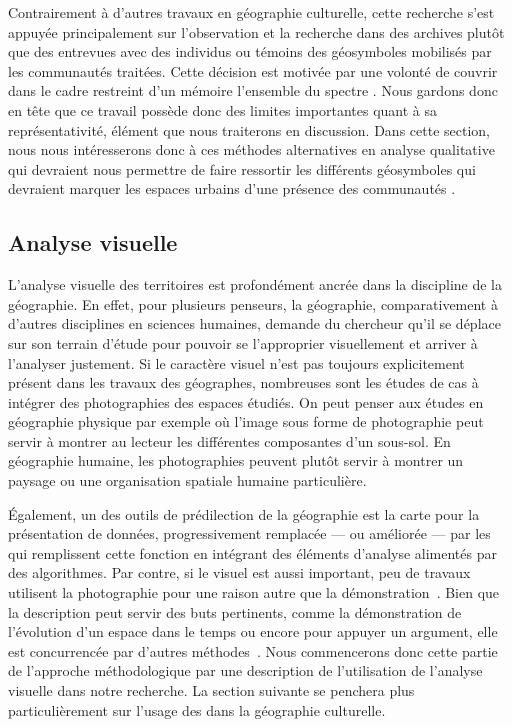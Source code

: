 Contrairement à d'autres travaux en géographie culturelle, cette recherche s'est appuyée principalement sur l'observation et la recherche dans des archives plutôt que des entrevues avec des individus \lgbt{} ou témoins des géosymboles mobilisés par les communautés traitées.
Cette décision est motivée par une volonté de couvrir dans le cadre restreint d'un mémoire l'ensemble du spectre \lgbt{}.
Nous gardons donc en tête que ce travail possède donc des limites importantes quant à sa représentativité, élément que nous traiterons en discussion.
Dans cette section, nous nous intéresserons donc à ces méthodes alternatives en analyse qualitative qui devraient nous permettre de faire ressortir les différents géosymboles qui devraient marquer les espaces urbains d'une présence des communautés \lgbt{}.

\subsection{Analyse visuelle}
\label{sub:analyse_visuelle}

L'analyse visuelle des territoires est profondément ancrée dans la discipline de la géographie.
En effet, pour plusieurs penseurs\missref{}, la géographie, comparativement à d'autres disciplines en sciences humaines, demande du chercheur qu'il se déplace sur son terrain d'étude pour pouvoir se l'approprier visuellement et arriver à l'analyser justement.
Si le caractère visuel n'est pas toujours explicitement présent dans les travaux des géographes, nombreuses sont les études de cas à intégrer des photographies des espaces étudiés.
On peut penser aux études en géographie physique par exemple où l'image sous forme de photographie peut servir à montrer au lecteur les différentes composantes d'un sous-sol.
En géographie humaine, les photographies peuvent plutôt servir à montrer un paysage ou une organisation spatiale humaine particulière.

Également, un des outils de prédilection de la géographie est la carte pour la présentation de données, progressivement remplacée --- ou améliorée --- par les \sig{} qui remplissent cette fonction en intégrant des éléments d'analyse alimentés par des algorithmes.
Par contre, si le visuel est aussi important, peu de travaux utilisent la photographie pour une raison autre que la démonstration~\citep[151]{Rose2008}.
Bien que la description peut servir des buts pertinents, comme la démonstration de l'évolution d'un espace dans le temps ou encore pour appuyer un argument, elle est concurrencée par d'autres méthodes~\parencite[158]{Rose2008}.
Nous commencerons donc cette partie de l'approche méthodologique par une description de l'utilisation de l'analyse visuelle dans notre recherche.
La section suivante se penchera plus particulièrement sur l'usage des \sig{} dans la géographie culturelle.

